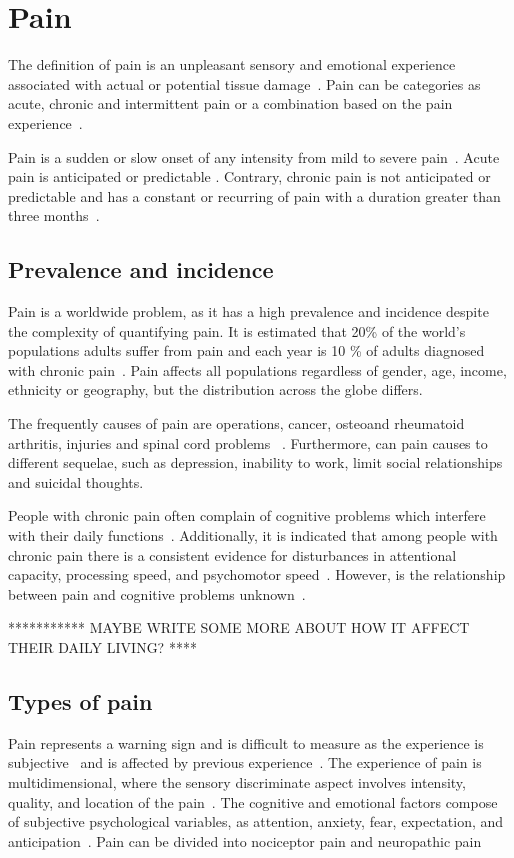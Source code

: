 \chapter{Pain}
The definition of pain is an unpleasant sensory and emotional experience associated with actual or potential tissue damage~\cite{Steeds2013, Mello2016}. Pain can be categories as acute, chronic and intermittent pain or a combination based on the pain experience~\cite{Goldberg2011}. 

Pain is a sudden or slow onset of any intensity from mild to severe pain~\cite{Mello2016}. Acute pain is anticipated or predictable \cite{Mello2016}. Contrary,  chronic pain is not anticipated or predictable and has a constant or recurring of pain with a duration greater than three months~\cite{Mello2016}.


\section{Prevalence and incidence}
Pain is a worldwide problem, as it has a high prevalence and incidence despite the complexity of quantifying pain\cite{Goldberg2011}. It is estimated that 20\% of the world's populations adults suffer from pain and each year is 10 \% of adults diagnosed with chronic pain~\cite{Goldberg2011}. Pain affects all populations regardless of gender, age, income, ethnicity or geography, but the distribution across the globe differs\cite{Goldberg2011}. 

The frequently causes of pain are operations, cancer, osteoand rheumatoid arthritis, injuries and spinal cord problems ~\cite{Goldberg2011}. Furthermore, can pain causes to different sequelae, such as depression, inability to work, limit social relationships and suicidal thoughts\cite{Goldberg2011}. 

People with chronic pain often complain of cognitive problems which interfere with their daily functions~\cite{Geisser2018}. Additionally, it is indicated that among people with chronic pain there is a consistent evidence for disturbances in attentional capacity, processing speed, and psychomotor speed~\cite{Geisser2018}. However, is the relationship between pain and cognitive problems unknown~\cite{Geisser2018}. 

*********** MAYBE WRITE SOME MORE ABOUT HOW IT AFFECT THEIR DAILY LIVING? ****

\section{Types of pain}
Pain represents a warning sign and is difficult to measure as the experience is subjective~\cite{Steeds2013} and is affected by previous experience~\cite{Ahmad2014}. The experience of pain is multidimensional, where the sensory discriminate aspect involves intensity, quality, and location of the pain~\cite{Ahmad2014}. The cognitive and emotional factors compose of subjective psychological variables, as attention, anxiety, fear, expectation, and anticipation~\cite{Ahmad2014}. Pain can be divided into nociceptor pain and neuropathic pain~\cite{Steeds2013}

